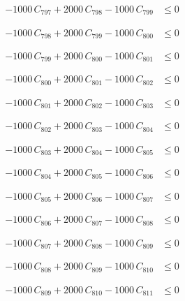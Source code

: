 \documentclass[a4paper,11pt]{article}
\begin{document}
\begin{align}
-1000\,C_{797} + 2000\,C_{798} - 1000\,C_{799} &\leq 0 \nonumber
\end{align}

\begin{align}
-1000\,C_{798} + 2000\,C_{799} - 1000\,C_{800} &\leq 0 \nonumber
\end{align}

\begin{align}
-1000\,C_{799} + 2000\,C_{800} - 1000\,C_{801} &\leq 0 \nonumber
\end{align}

\begin{align}
-1000\,C_{800} + 2000\,C_{801} - 1000\,C_{802} &\leq 0 \nonumber
\end{align}

\begin{align}
-1000\,C_{801} + 2000\,C_{802} - 1000\,C_{803} &\leq 0 \nonumber
\end{align}

\begin{align}
-1000\,C_{802} + 2000\,C_{803} - 1000\,C_{804} &\leq 0 \nonumber
\end{align}

\begin{align}
-1000\,C_{803} + 2000\,C_{804} - 1000\,C_{805} &\leq 0 \nonumber
\end{align}

\begin{align}
-1000\,C_{804} + 2000\,C_{805} - 1000\,C_{806} &\leq 0 \nonumber
\end{align}

\begin{align}
-1000\,C_{805} + 2000\,C_{806} - 1000\,C_{807} &\leq 0 \nonumber
\end{align}

\begin{align}
-1000\,C_{806} + 2000\,C_{807} - 1000\,C_{808} &\leq 0 \nonumber
\end{align}

\begin{align}
-1000\,C_{807} + 2000\,C_{808} - 1000\,C_{809} &\leq 0 \nonumber
\end{align}

\begin{align}
-1000\,C_{808} + 2000\,C_{809} - 1000\,C_{810} &\leq 0 \nonumber
\end{align}

\begin{align}
-1000\,C_{809} + 2000\,C_{810} - 1000\,C_{811} &\leq 0 \nonumber
\end{align}
\end{document}
